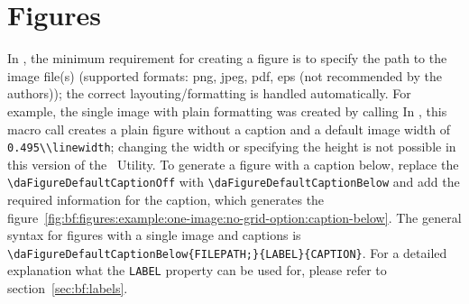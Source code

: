 \section{Figures}
	In \productName, the minimum requirement for creating a figure is to specify the path to the image file(s) (supported formats: png, jpeg, pdf, eps (not recommended by the authors)); the correct layouting/formatting is handled automatically. For example, the single image with plain formatting
	\newline was created by calling
	\lstset{style=LaTeX}
	In \productVersion, this macro call creates a plain figure without a caption and a default image width of \mbox{\lstinline$0.495\\linewidth$}; changing the width or specifying the height is not possible in this version of the \productName~Utility.
	\newline To generate a figure with a caption below, replace the \lstinline$\daFigureDefaultCaptionOff$ with \lstinline$\daFigureDefaultCaptionBelow$ and add the required information for the caption,
	\lstset{style=LaTeX}
	which generates the \mbox{figure \ref{fig:bf:figures:example:one-image:no-grid-option:caption-below}}. The general syntax for figures with a single image and captions is
	\lstinline$\daFigureDefaultCaptionBelow{FILEPATH;}{LABEL}{CAPTION}$. For a detailed explanation what the \lstinline$LABEL$ property can be used for, please refer to \mbox{section \ref{sec:bf:labels}}.
	
